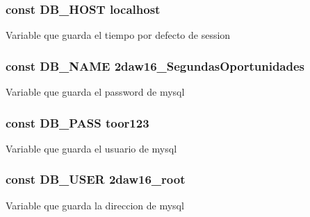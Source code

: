 \subsubsection[{D\+B\+\_\+\+H\+O\+S\+T}]{\setlength{\rightskip}{0pt plus 5cm}const D\+B\+\_\+\+H\+O\+S\+T \textquotesingle{}localhost\textquotesingle{}}\label{_config_8php_a293363d7988627f671958e2d908c202a}
Variable que guarda el tiempo por defecto de session \hypertarget{_config_8php_ab5db0d3504f917f268614c50b02c53e2}{}
\subsubsection[{D\+B\+\_\+\+N\+A\+M\+E}]{\setlength{\rightskip}{0pt plus 5cm}const D\+B\+\_\+\+N\+A\+M\+E \textquotesingle{}2daw16\+\_\+\+Segundas\+Oportunidades\textquotesingle{}}\label{_config_8php_ab5db0d3504f917f268614c50b02c53e2}
Variable que guarda el password de mysql \hypertarget{_config_8php_a8bb9c4546d91667cfa61879d83127a92}{}
\subsubsection[{D\+B\+\_\+\+P\+A\+S\+S}]{\setlength{\rightskip}{0pt plus 5cm}const D\+B\+\_\+\+P\+A\+S\+S \textquotesingle{}toor123\textquotesingle{}}\label{_config_8php_a8bb9c4546d91667cfa61879d83127a92}
Variable que guarda el usuario de mysql \hypertarget{_config_8php_a1d1d99f8e08f387d84fe9848f3357156}{}
\subsubsection[{D\+B\+\_\+\+U\+S\+E\+R}]{\setlength{\rightskip}{0pt plus 5cm}const D\+B\+\_\+\+U\+S\+E\+R \textquotesingle{}2daw16\+\_\+root\textquotesingle{}}\label{_config_8php_a1d1d99f8e08f387d84fe9848f3357156}
Variable que guarda la direccion de mysql \hypertarget{_config_8php_ae05204cd87e8b77b35a92c595e4d897a}{}
